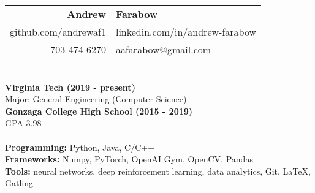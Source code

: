 \documentclass{article}
\begin{document}
  \begin{center}
    \begin{tabular}{r l}
      {\huge\textbf{Andrew}} & {\huge\textbf{Farabow}} \\
      \hspace{35pt} github.com/andrewaf1 & linkedin.com/in/andrew-farabow \\
      703-474-6270 & aafarabow@gmail.com \\
    \end{tabular}


  \begin{flushleft}
    \begin{multicols}{2}
      {\large\textbf{\underline{}}} \\
       \textbf{Virginia Tech	(2019 - present)} \\
      Major: General Engineering (Computer Science) \\
      \textbf{Gonzaga College High School	(2015 - 2019)} \\
      GPA 3.98 \\
     

    \columnbreak
    {\large\textbf{\underline{}}} \\
    {\textbf{Programming:}} Python, Java, C/C++ \\
    {\textbf{Frameworks:}} Numpy, PyTorch, OpenAI Gym, OpenCV, Pandas \\
    {\textbf{Tools:}} neural networks, deep reinforcement learning, data analytics, Git, LaTeX, Gatling \\

    \end{multicols}


\end{flushleft}
\end{center}
\end{document}
